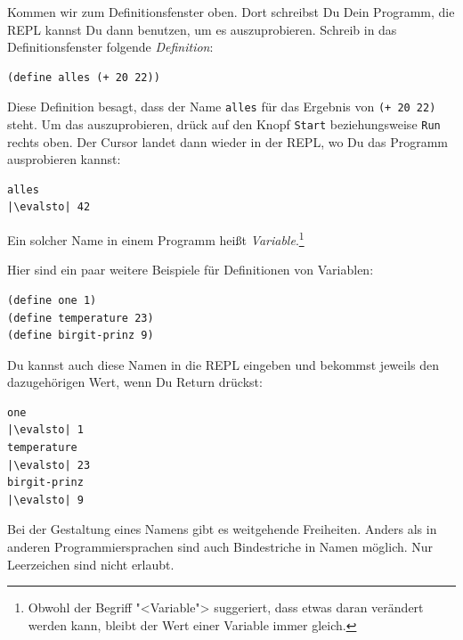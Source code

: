 Kommen wir zum Definitionsfenster oben.  Dort schreibst Du Dein
Programm, die REPL kannst Du dann benutzen, um es auszuprobieren.
Schreib in das Definitionsfenster folgende
\textit{Definition}:
%
\begin{lstlisting}
(define alles (+ 20 22))
\end{lstlisting}
%
Diese Definition besagt, dass der Name \lstinline{alles} für das Ergebnis
von \lstinline{(+ 20 22)} steht.  Um das auszuprobieren, drück auf den
Knopf \texttt{Start} beziehungsweise \texttt{Run} rechts oben.  Der Cursor
landet dann wieder in der REPL, wo Du das Programm ausprobieren
kannst:
%
\begin{lstlisting}
alles
|\evalsto| 42
\end{lstlisting}
%
Ein solcher Name in einem Programm heißt
\textit{Variable}.\footnote{Obwohl der Begriff
  "<Variable"> suggeriert, dass etwas daran verändert werden
  kann, bleibt der Wert einer Variable immer gleich.}

Hier sind ein paar weitere Beispiele für Definitionen von Variablen:
%
\begin{lstlisting}
(define one 1)
(define temperature 23)
(define birgit-prinz 9)
\end{lstlisting}
%
Du kannst auch diese Namen in die REPL eingeben und bekommst
jeweils den dazugehörigen Wert, wenn Du Return drückst:
%
\begin{lstlisting}
one
|\evalsto| 1
temperature
|\evalsto| 23
birgit-prinz
|\evalsto| 9
\end{lstlisting}
%
Bei der Gestaltung eines Namens gibt es weitgehende Freiheiten. Anders
als in anderen Programmiersprachen sind auch Bindestriche in Namen
möglich.  Nur Leerzeichen sind nicht erlaubt.

